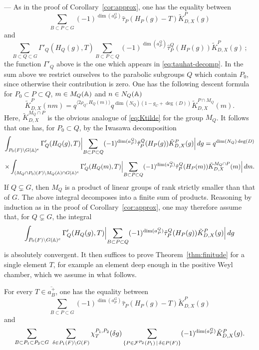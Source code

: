 \begin{paragr} ---\label{S:preuve-finitude}
As in the proof of Corollary~\ref{cor:approx}, one has the equality between
$$\sum_{B\subset P\subset G} (-1)^{\dim(a_P^G)}\hat{\tau}_P(H_P(g)-T)\tilde{K}^P_{D,X}(g)$$
and
$$\sum_{B\subset Q\subset G}\Gamma'_Q(H_Q(g),T)\sum_{B\subset P\subset Q} (-1)^{\dim(a_P^Q)}\hat{\tau}_P^Q(H_P(g))\tilde{K}^P_{D,X}(g)\,;$$
the function $\Gamma'_Q$ above is the one which appears in \eqref{eq:tauhat-decomp}. In the sum above we restrict ourselves to the parabolic subgroups $Q$ which contain $P_0$, since otherwise their contribution is zero. One has the following descent formula for $P_0\subset P\subset Q$, $m\in M_Q(\mathbb{A})$ and $n\in N_Q(\mathbb{A})$
$$\tilde{K}^P_{D,X}(nm)=q^{\langle 2\rho_Q,H_Q(m)\rangle}q^{\dim(N_Q)(1-g_C+\deg(D))}\tilde{K}^{P\cap M_Q}_{D,X}(m).$$
Here, $\tilde{K}^{M_Q\cap P}_{D,X}$ is the obvious analogue of \eqref{eq:Ktilde} for the group $M_Q$. It follows that one has, for $P_0\subset Q$, by the Iwasawa decomposition
$$\int_{P_0(F)\backslash G(\mathbb{A})^e}\Gamma'_Q(H_Q(g),T)\Bigl|\sum_{B\subset P\subset Q} (-1)^{\dim(a_P^Q)}\hat{\tau}_P^Q(H_P(g))\tilde{K}^P_{D,X}(g)\Bigr|\, dg=q^{\dim(N_Q)\deg(D)}$$
$$\times \int_{(M_Q\cap P_0)(F)\backslash M_Q(\mathbb{A})\cap G(\mathbb{A})^e}\Gamma'_Q(H_Q(m),T)\Bigl|\sum_{B\subset P\subset Q} (-1)^{\dim(a_P^Q)}\hat{\tau}_P^Q(H_P(m))\tilde{K}^{M_Q\cap P}_{D,X}(m)\Bigr|\, dm.$$
If $Q\subsetneq G$, then $M_Q$ is a product of linear groups of rank strictly smaller than that of $G$. The above integral decomposes into a finite sum of products. Reasoning by induction as in the proof of Corollary~\ref{cor:approx}, one may therefore assume that, for $Q\subsetneq G$, the integral
$$\int_{P_0(F)\backslash G(\mathbb{A})^e}\Gamma'_Q(H_Q(g),T)\Bigl|\sum_{B\subset P\subset Q} (-1)^{\dim(a_P^Q)}\hat{\tau}_P^Q(H_P(g))\tilde{K}^P_{D,X}(g)\Bigr|\, dg$$
is absolutely convergent. It then suffices to prove Theorem~\ref{thm:finitude} for a single element $T$, for example an element deep enough in the positive Weyl chamber, which we assume in what follows.

\begin{lemme}\label{lem:decomp-chi}
For every $T\in \overline{a_B^+}$, one has the equality between
$$\sum_{B\subset P\subset G} (-1)^{\dim(a_P^G)}\hat{\tau}_P(H_P(g)-T)\tilde{K}^P_{D,X}(g)$$
and
$$\sum_{B\subset P_1\subset P_2\subset G}\ \sum_{\delta\in P_1(F)\backslash G(F)} \chi_T^{P_1,P_2}(\delta g)\sum_{\{P\in \mathcal{F}^{P_2}(P_1)\,|\,\delta\in P(F)\}} (-1)^{\dim(a_P^G)}\tilde{K}^P_{D,X}(g).$$
\end{lemme}


\end{paragr}
